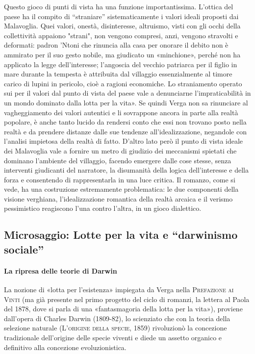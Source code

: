 \documentclass{book}
\newcounter{mar}
\begin{document}
Questo gioco di punti di vista ha una funzione importantissima. L'ottica del paese ha il compito di “straniare” sistematicamente i valori ideali proposti dai Malavoglia. Quei valori, onestà, disinteresse, altruismo, visti con gli occhi della collettività appaiono "strani", non vengono compresi, anzi, vengono stravolti e deformati: padron 'Ntoni che rinuncia alla casa per onorare il debito non è ammirato per il suo gesto nobile, ma giudicato un «minchione», perché non ha applicato la legge dell'interesse; l'angoscia del vecchio patriarca per il figlio in mare durante la tempesta è attribuita dal villaggio essenzialmente al timore carico di lupini in pericolo, cioè a ragioni economiche. Lo straniamento operato sui per il valori dal punto di vista del paese vale a denunciarne l'impraticabilità in un mondo dominato dalla lotta per la vita». Se quindi Verga non sa rinunciare al vagheggiamento dei valori autentici e li sovrappone ancora in parte alla realtà popolare, è anche tanto lucido da rendersi conto che essi non trovano posto nella realtà e da prendere distanze dalle sue tendenze all'idealizzazione, negandole con l'analisi impietosa della realtà di fatto. D'altro lato però il punto di vista ideale dei Malavoglia vale a fornire un metro di giudizio dei meccanismi spietati che dominano l'ambiente del villaggio, facendo emergere dalle cose stesse, senza interventi giudicanti del narratore, la disumanità della logica dell'interesse e della forza e consentendo di rappresentarla in una luce critica. Il romanzo, come si vede, ha una costruzione estremamente problematica: le due componenti della visione verghiana, l'idealizzazione romantica della realtà arcaica e il verismo pessimistico reagiscono l'una contro l'altra, in un gioco dialettico.

\subsection{Microsaggio: Lotte per la vita e ``darwinismo
sociale''}

\paragraph{La ripresa delle teorie di Darwin} La nozione di «lotta per l'esistenza» impiegata da Verga nella \textsc{Prefazione ai Vinti} (ma già presente nel primo progetto del ciclo di romanzi, la lettera al Paola del 1878, dove si parla di una «fantasmagoria della lotta per la vita»), proviene dall'opera di Charles Darwin (1809-82), lo scienziato che con la teoria della selezione naturale (\textsc{L'origine della specie}, 1859) rivoluzionò la concezione tradizionale dell'origine delle specie viventi e diede un assetto organico e definitivo alla concezione evoluzionistica.
\end{document}
